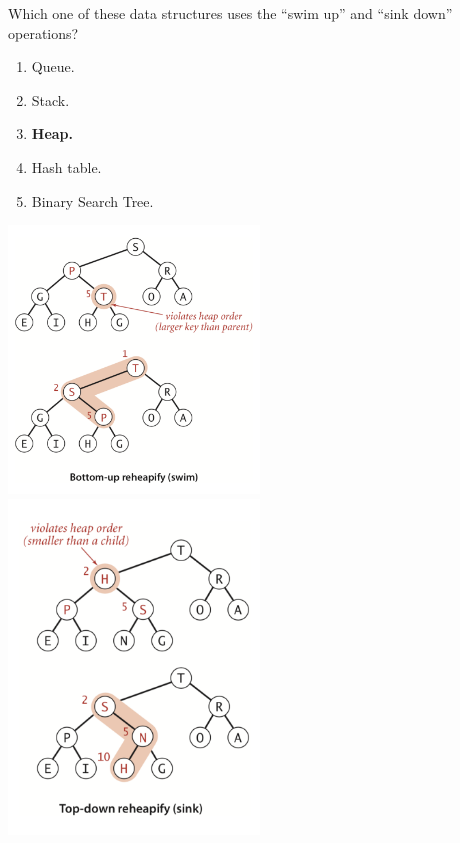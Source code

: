 \documentclass[a4paper]{article}
\newenvironment{question}[2][Question]{\begin{trivlist}
\item[\hskip \labelsep {\bfseries #1}\hskip \labelsep {\bfseries #2.}]}{\end{trivlist}}
\begin{document}
\begin{question}{9}
Which one of these data structures uses the “swim up” and “sink down”
operations?

\begin{enumerate}[label=\alph*]
  \item Queue.
  \item Stack.
  \item \textbf{Heap.}
  \item Hash table.
  \item Binary Search Tree.
\end{enumerate}

\includegraphics[width=0.5\textwidth]{fig5.png}
\includegraphics[width=0.5\textwidth]{fig6.png}

\end{question}
\end{document}

